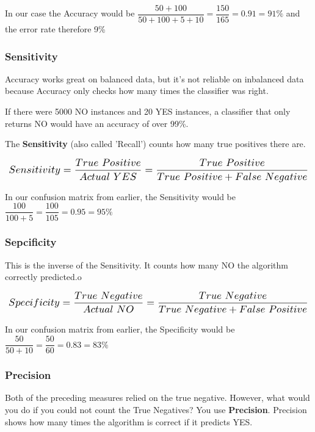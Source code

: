 \documentclass[a4paper, 11pt]{article}
\begin{document}
\vspace{10px}

In our case the Accuracy would be $\dfrac{50+100}{50+100+5+10} = \dfrac{150}{165} = 0.91 = 91\%$ and the error rate therefore 9\%

\newpage

\subsubsection{Sensitivity}

Accuracy works great on balanced data, but it's not reliable on inbalanced data because Accuracy only checks how many times the classifier was right. 

If there were 5000 NO instances and 20 YES instances, a classifier that only returns NO would have an accuracy of over 99\%.

\vspace{10px}

\noindent The \textbf{Sensitivity} (also called 'Recall') counts how many true positives there are.

\[\scalebox{1.5}{
        $Sensitivity = \dfrac{True\ Positive}{Actual\ YES} = \dfrac{True\ Positive}{True\ Positive + False\ Negative} $
}\]

\vspace{10px}

In our confusion matrix from earlier, the Sensitivity would be $\dfrac{100}{100 + 5} = \dfrac{100}{105} = 0.95 = 95\%$

\subsubsection{Sepcificity}
This is the inverse of the Sensitivity. It counts how many NO the algorithm correctly predicted.o

\[\scalebox{1.5}{
        $Specificity= \dfrac{True\ Negative}{Actual\ NO} = \dfrac{True\ Negative}{True\ Negative + False\ Positive} $
}\]

\vspace{10px}

In our confusion matrix from earlier, the Specificity would be $\dfrac{50}{50+ 10} = \dfrac{50}{60} = 0.83 = 83\%$

\subsubsection{Precision}
Both of the preceding measures relied on the true negative. However, what would you do if you could not count the True Negatives? You use \textbf{Precision}. Precision shows how many times the algorithm is correct if it predicts YES.
\end{document}
